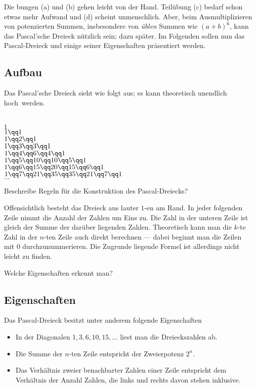 \documentclass[
twoside,%
ngerman,%
headsepline%
11pt]%
{article}
\begin{document}
Die bungen (a) und (b) gehen leicht von der Hand. Teil\"ubung (c) bedarf schon etwas mehr Aufwand und (d) scheint unmenschlich. Aber, beim Ausmultiplizieren von potenzierten Summen, insbesondere von \emph{\"ublen} Summen wie $(a+b)^6$, kann das Pascal'sche Dreieck n\"utzlich sein; dazu sp\"ater. Im Folgenden sollen nun das Pascal-Dreieck und einige seiner Eigenschaften pr\"asentiert werden.
\subsection{Aufbau}
Das Pascal'sche Dreieck sieht wie folgt aus; es kann theoretisch unendlich \glqq hoch\grqq\ werden.

  \begin{center}
    \ \\[2pt]
    $1$\\[6pt]
    $1\qq1$\\[6pt]
    $1\qq2\qq1$\\[6pt]
    $1\qq3\qq3\qq1$\\[6pt]
    $1\qq4\qq6\qq4\qq1$\\[6pt]
    $1\qq5\qq10\qq10\qq5\qq1$\\[6pt]
    $1\qq6\qq15\qq20\qq15\qq6\qq1$\\[6pt]
    $1\qq7\qq21\qq35\qq35\qq21\qq7\qq1$\\[6pt]
    $\dots$
  \end{center}

\begin{frage}
Beschreibe Regeln f\"ur die Konstruktion des Pascal-Dreiecks?
\end{frage}
Offensichtlich besteht das Dreieck aus lauter $1$-en am Rand. In jeder folgenden Zeile nimmt die Anzahl der Zahlen um Eins zu. Die Zahl in der unteren Zeile ist gleich der Summe der dar\"uber liegenden Zahlen. Theoretisch kann man die $k$-te Zahl in der $n$-ten Zeile auch direkt berechnen  --- dabei beginnt man die Zeilen mit $0$ durchzunummerieren. Die Zugrunde liegende Formel ist allerdings nicht leicht zu finden.

\begin{frage}
Welche Eigenschaften erkennt man?
\end{frage}

\subsection{Eigenschaften}
Das Pascal-Dreieck besitzt unter anderem folgende Eigenschaften
\begin{itemize}
\item In der Diagonalen $1,3,6,10,15,\dots$ liest man die Dreieckszahlen ab.
\item Die Summe der $n$-ten Zeile entspricht der Zweierpotenz $2^{n}$.
\item Das Verh\"altnis zweier benachbarter Zahlen einer Zeile entspricht dem Verh\"altnis der Anzahl Zahlen, die links und rechts davon stehen inklusive.
\end{itemize}
\end{document}
